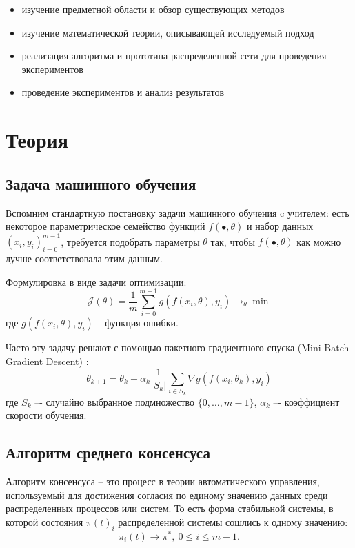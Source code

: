 \documentclass[a4paper,article,14pt]{extarticle}
\begin{document}
\begin{itemize}
  \item изучение предметной области и обзор существующих методов
  \item изучение математической теории, описывающей исследуемый подход
  \item реализация алгоритма и прототипа распределенной сети для проведения экспериментов
  \item проведение экспериментов и анализ результатов
\end{itemize}
\pagebreak

\section{Теория}
\subsection{Задача машинного обучения}
Вспомним стандартную постановку задачи машинного обучения c учителем: есть некоторое параметрическое семейство функций  $f(\bullet, \theta)$ и набор данных $(x_i, y_i)_{i=0}^{m-1}$, требуется подобрать параметры $\theta$ так, чтобы $f(\bullet, \theta)$ как можно лучше соответствовала этим данным.

Формулировка в виде задачи оптимизации:
 \begin{equation} \label{eq:ml_task}
 \mathcal{J}(\theta)=
 \frac{1}{m}\sum_{i=0}^{m-1}g(f(x_i, \theta), y_i)\rightarrow_{\theta}\min
 \end{equation}
где $g(f(x_i, \theta), y_i)$ -- функция ошибки.

Часто эту задачу решают с помощью пакетного градиентного спуска (Mini Batch Gradient Descent) \cite{mbgd}:
  \begin{equation} \label{eq:mbgd}
\theta_{k+1} = \theta_k - \alpha_k\frac{1}{|S_k|}\sum_{i\in S_k}\nabla g(f(x_i, \theta_k), y_i)
 \end{equation}
где $S_k$ –- случайно выбранное подмножество $\{0, \ldots, m-1\}$, $\alpha_k$ –- коэффициент скорости обучения.

\subsection{Алгоритм среднего консенсуса}
\label{section:algo_mean_cons}

Алгоритм консенсуса -- это процесс в теории автоматического управления, используемый для достижения согласия по единому значению данных среди распределенных процессов или систем. То есть форма стабильной системы, в которой состояния $\pi(t)_i$ распределенной системы сошлись к одному значению:
\begin{equation}
\pi_i(t)\rightarrow \pi^*,~0\leq i\leq m-1.
\end{equation}
\end{document}
